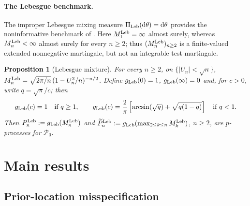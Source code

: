 \documentclass{article}
\newtheorem{proposition}{Proposition}
\begin{document}
\paragraph{The Lebesgue benchmark.}
The improper Lebesgue mixing measure $\Pi_{\mathrm{Leb}}(\mathrm{d}\theta)=\mathrm{d}\theta$
provides the noninformative benchmark of \citet{Lai1976,Wang2025}. Here
$M_1^{\mathrm{Leb}}=\infty$ almost surely, whereas $M_n^{\mathrm{Leb}}<\infty$ almost
surely for every $n\geq2$; thus $(M_n^{\mathrm{Leb}})_{n\geq2}$ is a
finite-valued extended nonnegative martingale, but not an integrable test
martingale.

\begin{proposition}[Lebesgue mixture]
\label{prop:Mn-Leb}
For every $n\geq2$, on $\{|U_n|<\sqrt n\}$,
$M_n^{\mathrm{Leb}}=\sqrt{2\pi/n}\,(1-U_n^2/n)^{-n/2}$. Define $g_{\mathrm{Leb}}(0)=1$,
$g_{\mathrm{Leb}}(\infty)=0$ and, for $c>0$, write $q=\sqrt\pi/c$; then
\begin{equation}
\label{eq:g-Leb}
  g_{\mathrm{Leb}}(c)=1 \quad\text{if } q\geq1,
  \qquad
  g_{\mathrm{Leb}}(c)
  =\frac{2}{\pi}\left[\arcsin\!\left(\sqrt q\right)+\sqrt{q(1-q)}\right]
  \quad\text{if } q<1 .
\end{equation}
Then $P_n^{\mathrm{Leb}}:=g_{\mathrm{Leb}}(M_n^{\mathrm{Leb}})$ and
$\widetilde P_n^{\mathrm{Leb}}:=g_{\mathrm{Leb}}(\max_{2\leq k\leq n}M_k^{\mathrm{Leb}})$,
$n\geq2$, are $p$-processes for $\mathcal P_0$.
\end{proposition}



\section{Main results}
\label{sec:mainresult}

\subsection{Prior-location misspecification}
\label{subsec:location-misspecification}
\end{document}
